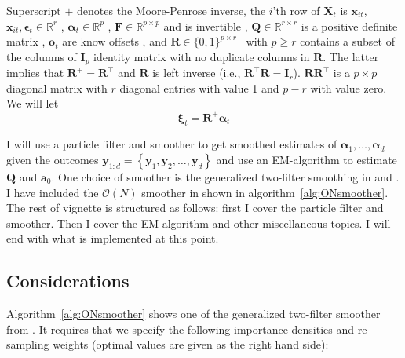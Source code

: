 \documentclass[9pt, notitlepage]{article}
\renewcommand{\vec}[1]{\bm{#1}}
\newcommand{\mat}[1]{\mathbf{#1}}
\newcommand{\Lbrace}[1]{\left\{ #1\right\}}
\newcommand{\Lparen}[1]{\left( #1\right)}
\newcommand{\bigO}[1]{\mathcal{O}\Lparen{#1}}
\newcommand{\dimState}{p}
\newcommand{\dimRng}{r}
\newcommand{\nPart}{N}
\newcommand{\nPeriods}{d}
\begin{document}
Superscript $+$ denotes the Moore-Penrose inverse, %
the $i$'th row of $\mat{X}_t$ is $\vec{x}_{it}$, $\vec{x}_{it},\vec{\epsilon}_t\in\mathbb{R}^\dimRng$%
, $\vec{\alpha}_t\vec\in\mathbb{R}^\dimState$%
, $\mat{F} \in \mathbb{R}^{\dimState\times\dimState}$ and is invertible%
, $\mat{Q} \in \mathbb{R}^{\dimRng\times\dimRng}$ is a positive definite matrix%
, $\vec{o}_t$ are know offsets%
, and $\mat{R} \in \{0,1\}^{\dimState\times \dimRng}$%
~with $\dimState\geq\dimRng$ contains a subset of the columns of $\mat{I}_{\dimState}$ identity matrix with no duplicate columns in $\mat{R}$. The latter implies that $\mat{R}^+ = \mat{R}^\top$ and $\mat{R}$ is left inverse (i.e., $\mat{R}^\top\mat{R} = \mat{I}_\dimRng$). $\mat{R}\mat{R}^\top$ is a $\dimState\times\dimState$ diagonal matrix with $\dimRng$ diagonal entries with value 1 and $\dimState - \dimRng$ with value zero. We will let %
%
$$\vec{\xi}_{t} = \mat{R}^{+}\vec{\alpha}_t$$

I will use a particle filter and smoother to get smoothed estimates of $\vec{\alpha}_1, \dots, \vec{\alpha}_\nPeriods$ given the outcomes $\vec{y}_{1:\nPeriods} = \Lbrace{\vec{y}_1,\vec{y}_2,\dots, \vec{y}_\nPeriods}$ and use an EM-algorithm to estimate $\mat{Q}$ and $\vec{a}_0$. One choice of smoother is the generalized two-filter smoothing in \cite{fearnhead10} and \cite{briers10}. I have included the $\bigO{\nPart}$ smoother in \cite{fearnhead10} shown in algorithm~\ref{alg:ONsmoother}. The rest of vignette is structured as follows: first I cover the particle filter and smoother. Then I cover the EM-algorithm and other miscellaneous topics. I will end with what is implemented at this point.

\subsection*{Considerations}
Algorithm~\ref{alg:ONsmoother} shows one of the generalized two-filter smoother from \cite{fearnhead10}. It requires that we specify the following importance densities and re-sampling weights (optimal values are given as the right hand side):
\end{document}
